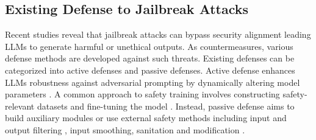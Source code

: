 \subsection{Existing Defense to Jailbreak Attacks}
Recent studies reveal that jailbreak attacks \cite{zou2023universal, liu2023autodan, zhou2024don, chao2023jailbreaking} can bypass security alignment leading LLMs to generate harmful or unethical outputs.
As countermeasures, various defense methods are developed against such threats.
Existing defenses can be categorized into active defenses and passive defenses. Active defense enhances LLMs robustness against adversarial prompting by dynamically altering model parameters \cite{wang2022self, ganguli2022red, xu2024safedecoding, wang2024detoxifying, zhao2024defending}. A common approach to safety training involves constructing safety-relevant datasets and fine-tuning the model \cite{mazeika2024harmbench}.
Instead, passive defense aims to build auxiliary modules or use external safety methods including input and output filtering \cite{alon2023detecting}, input smoothing, sanitation and modification \cite{cao2023defending, jain2023baseline, zhou2024robust}.



